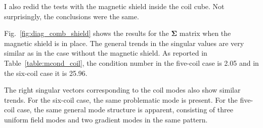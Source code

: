 I also redid the tests with the magnetic shield inside the coil cube.
Not surprisingly, the conclusions were the same.



Fig.~\ref{fig:diag_comb_shield} shows the results for the
$\bm{\Sigma}$ matrix when the magnetic shield is in place.  The
general trends in the singular values are very similar as in the case
without the magnetic shield.  As reported in
Table~\ref{table:mcond_coil}, the condition number in the five-coil
case is 2.05 and in the six-coil case it is 25.96.


The right singular vectors corresponding to the coil modes also show
similar trends.  For the six-coil case, the same problematic mode is
present.  For the five-coil case, the same general mode structure is
apparent, consisting of three uniform field modes and two gradient
modes in the same pattern.


 


